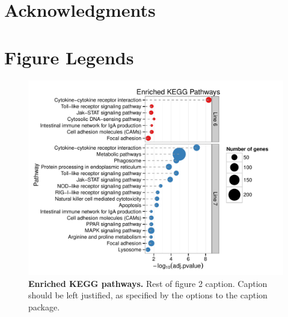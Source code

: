 \documentclass[10pt]{article}
\begin{document}
\section*{Acknowledgments}

{}

\section*{Figure Legends}
\begin{figure}[!ht]
\begin{center}
\includegraphics[width=7in]{line67_KEGG_cleveland.pdf}
\end{center}
\caption{
{\bf Enriched KEGG pathways.} Rest of figure 2  caption.  Caption 
should be left justified, as specified by the options to the caption 
package.
}
\label{line67_kegg}
\end{figure}
\end{document}
